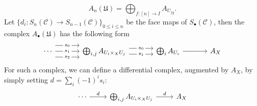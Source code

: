 \begin{equation}\label{ringed topos Cech complex for covering-3}
A_n(\mathfrak{U})=\bigoplus_{f:[n]\to I}A_{U_{fg}}.
\end{equation}
Let $\{d_i:S_n(\mathcal{C})\to S_{n-1}(\mathcal{C})\}_{0\leq i\leq n}$ be the face maps of $S_\bullet(\mathcal{C})$, then the complex $A_\bullet(\mathfrak{U})$ has the following form
\begin{equation}\label{ringed topos Cech complex for covering-4}
\begin{tikzcd}[column sep=12mm]
\cdots\ar[r,shift left=8pt,"s_0"description]\ar[r,"s_1"description]\ar[r,shift right=8pt,"s_2"description]
&\bigoplus_{i,j}A_{U_i\times_XU_j}\ar[r,shift left=4pt,"s_0"description]\ar[r,shift right=4pt,"s_1"description]
&\bigoplus_iA_{U_i}\ar[r]
&A_X
\end{tikzcd}
\end{equation}
For such a complex, we can define a differential complex, augmented by $A_X$, by simply setting $d=\sum_i(-1)^is_i$:
\begin{equation}\label{ringed topos Cech complex for covering-5}
\begin{tikzcd}
\cdots\ar[r,"d"]&\bigoplus_{i,j}A_{U_i\times_XU_j}\ar[r,"d"]&A_X
\end{tikzcd}
\end{equation}


